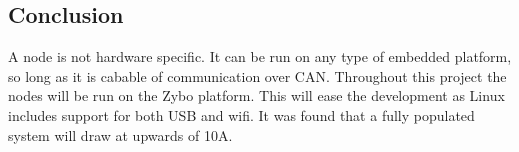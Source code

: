 \subsection{Conclusion}
A node is not hardware specific. 
It can be run on any type of embedded platform, so long as it is cabable of communication over CAN.
Throughout this project the nodes will be run on the Zybo platform.
This will ease the development as Linux includes support for both USB and wifi.
It was found that a fully populated system will draw at upwards of 10\si{\ampere}.